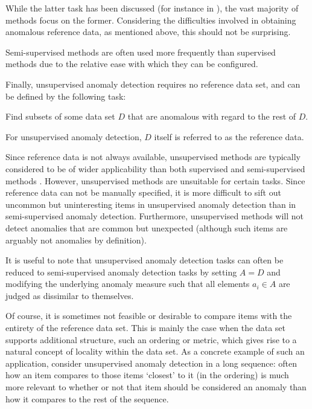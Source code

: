 While the latter task has been discussed (for instance in \cite{dasgupta}), the vast majority of methods focus on the former. Considering the difficulties involved in obtaining anomalous reference data, as mentioned above, this should not be surprising.

Semi-supervised methods are often used more frequently than supervised methods due to the relative ease with which they can be configured.

Finally, unsupervised anomaly detection requires no reference data set, and can be defined by the following task:
\begin{task}
  \label{task:unsupervised_anomaly_detection}
  Find subsets of some data set $D$ that are anomalous with regard to the rest of $D$.
\end{task}

For unsupervised anomaly detection, $D$ itself is referred to as the reference data.

Since reference data is not always available, unsupervised methods are typically considered to be of wider applicability than both supervised and semi-supervised methods \cite{chandola}. However, unsupervised methods are unsuitable for certain tasks. Since reference data can not be manually specified, it is more difficult to sift out uncommon but uninteresting items in unsupervised anomaly detection than in semi-supervised anomaly detection. Furthermore, unsupervised methods will not detect anomalies that are common but unexpected (although such items are arguably not anomalies by definition).

It is useful to note that unsupervised anomaly detection tasks can often be reduced to semi-supervised anomaly detection tasks by setting $A = D$ and modifying the underlying anomaly measure such that all elements $a_i \in A$ are judged as dissimilar to themselves.

Of course, it is sometimes not feasible or desirable to compare items with the entirety of the reference data set. This is mainly the case when the data set supports additional structure, such an ordering or metric, which gives rise to a natural concept of locality within the data set. As a concrete example of such an application, consider unsupervised anomaly detection in a long sequence: often how an item compares to those items `closest' to it (in the ordering) is much more relevant to whether or not that item should be considered an anomaly than how it compares to the rest of the sequence.

